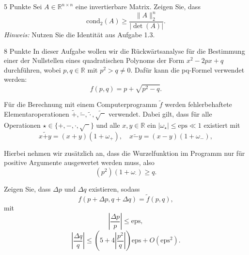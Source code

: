 \documentclass{problemset}
\author{Michael van Straten}
\begin{document}
\maketitle

\setcounter{problem}{2}

\begin{problem}{5 Punkte}
Sei \( A \in \mathbb{R}^{n \times n} \) eine invertierbare Matrix. Zeigen Sie, dass
\[
    \text{cond}_2(A) \geq \frac{\|A\|_2^n}{|\det(A)|}.
\]
\textit{Hinweis:} Nutzen Sie die Identität aus Aufgabe 1.3.
\end{problem}

\begin{problem}{8 Punkte}
In dieser Aufgabe wollen wir die Rückwärtsanalyse für die Bestimmung einer der
Nullstellen eines quadratischen Polynoms der Form \( x^2 - 2px + q \)
durchführen, wobei \( p, q \in \mathbb{R} \) mit \( p^2 > q \neq 0 \). Dafür
kann die pq-Formel verwendet werden:
\[
    f(p, q) = p + \sqrt{p^2 - q}.
\]

Für die Berechnung mit einem Computerprogramm \( \tilde{f} \) werden
fehlerbehaftete Elementaroperationen \( \tilde{+}, \tilde{-}, \tilde{\cdot},
\tilde{\sqrt{\phantom{x}}} \) verwendet. Dabei gilt, dass für alle Operationen
\( \star \in \{+, -, \cdot, \sqrt{\phantom{x}}\} \) und alle \( x, y \in
\mathbb{R} \) ein \( |\omega_\star| \leq \text{eps} \ll 1 \) existiert mit
\[
    x \tilde{+} y = (x + y)(1 + \omega_+), \quad x \tilde{-} y = (x - y)(1 + \omega_-),
\]

Hierbei nehmen wir zusätzlich an, dass die Wurzelfunktion im Programm nur für
positive Argumente ausgewertet werden muss, also
\[
    (p^2)(1 + \omega_\cdot) \geq q.
\]

Zeigen Sie, dass \( \Delta p \) und \( \Delta q \) existieren, sodass
\[
    f(p + \Delta p, q + \Delta q) = \tilde{f}(p, q),
\]
mit
\[
    \left|\frac{\Delta p}{p}\right| \leq \text{eps},
\]
\[
    \left|\frac{\Delta q}{q}\right| \leq \left(5 + 4 \left|\frac{p^2}{q}\right|\right) \text{eps} + O(\text{eps}^2).
\]
\end{problem}
\end{document}
